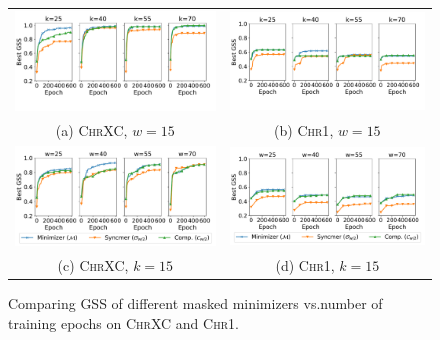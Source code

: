 \begin{figure}[ht]
\centering
\begin{tabular}{cc}
\includegraphics[width=0.487\columnwidth]{masked_mnz_plots/fig2a/compare_best_gss_vs_epoch_chrXC.pdf} & 
\includegraphics[width=0.487\columnwidth]{masked_mnz_plots/fig2a/compare_best_gss_vs_epoch_chr1.pdf} \\
(a) \textsc{ChrXC}, $w=15$ & (b) \textsc{Chr1}, $w=15$ \\
\includegraphics[width=0.487\columnwidth]{masked_mnz_plots/fig2b/compare_best_gss_vs_epoch_chrXC.pdf} & 
\includegraphics[width=0.487\columnwidth]{masked_mnz_plots/fig2b/compare_best_gss_vs_epoch_chr1.pdf}\\
(c) \textsc{ChrXC}, $k=15$ & (d) \textsc{Chr1}, $k=15$
\end{tabular}    
\caption{Comparing GSS of different masked minimizers vs.\@ number of training epochs on \textsc{ChrXC} and \textsc{Chr1}.}
\label{fig:2}
\end{figure}

